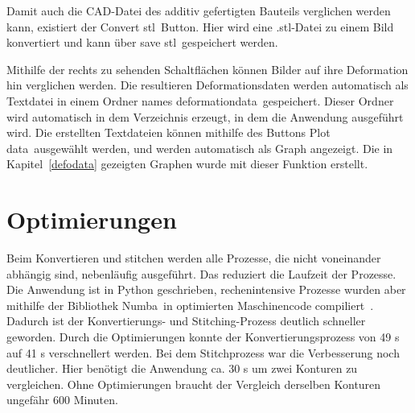 Damit auch die CAD-Datei des additiv gefertigten Bauteils verglichen werden kann, 
existiert der \glqq Convert stl\grqq~Button. Hier wird eine .stl-Datei zu einem Bild 
konvertiert und kann über \glqq save stl\grqq~gespeichert werden.

Mithilfe der rechts zu sehenden Schaltflächen können Bilder auf ihre Deformation hin 
verglichen werden. Die resultieren Deformationsdaten werden automatisch als Textdatei
in einem Ordner names \glqq deformation\textunderscore data\grqq~gespeichert. 
Dieser Ordner wird automatisch in dem Verzeichnis erzeugt, in dem die Anwendung ausgeführt wird. 
Die erstellten Textdateien können mithilfe des Buttons \glqq Plot data\grqq~ausgewählt 
werden, und werden automatisch als Graph angezeigt.
Die in Kapitel~\ref{defodata} gezeigten Graphen wurde mit dieser Funktion erstellt.

\section{Optimierungen}

Beim Konvertieren und stitchen werden alle Prozesse, die nicht voneinander abhängig sind,  
nebenläufig ausgeführt. Das reduziert die Laufzeit der Prozesse.
Die Anwendung ist in Python geschrieben, rechenintensive Prozesse wurden aber mithilfe 
der Bibliothek \glqq Numba\grqq~in optimierten Maschinencode compiliert~\cite{numba}.
Dadurch ist der Konvertierungs- und Stitching-Prozess deutlich schneller geworden. 
Durch die Optimierungen konnte der Konvertierungsprozess von 49 s auf 41 s verschnellert 
werden. Bei dem Stitchprozess war die Verbesserung noch deutlicher. Hier benötigt die 
Anwendung ca. 30 s um zwei Konturen zu vergleichen.
Ohne Optimierungen braucht der Vergleich derselben Konturen 
ungefähr 600 Minuten.
